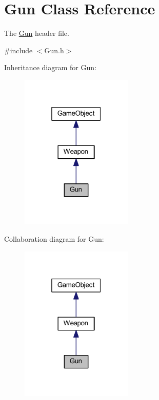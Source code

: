 \hypertarget{class_gun}{\section{Gun Class Reference}
\label{class_gun}
}


The \hyperlink{class_gun}{Gun} header file.  




{\ttfamily \#include $<$Gun.\+h$>$}



Inheritance diagram for Gun\+:\nopagebreak
\begin{figure}[H]
\begin{center}
\leavevmode
\includegraphics[width=151pt]{class_gun__inherit__graph}
\end{center}
\end{figure}


Collaboration diagram for Gun\+:\nopagebreak
\begin{figure}[H]
\begin{center}
\leavevmode
\includegraphics[width=151pt]{class_gun__coll__graph}
\end{center}
\end{figure}
